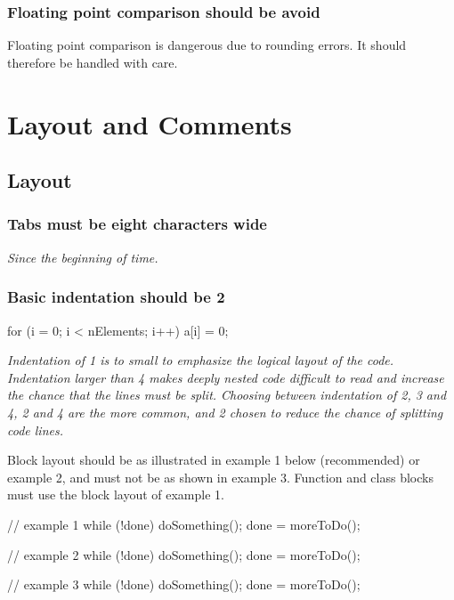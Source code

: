 \documentclass[a4paper,11pt,oneside]{scrbook}
\newcommand{\guideline}[1]{{\subsection{#1}}}
\newcommand{\motivation}[1]{{\normalfont \itshape #1}}
\begin{document}
\guideline{Floating point comparison should be avoid}

Floating point comparison is dangerous due to rounding errors. It should therefore
be handled with care.

\chapter{Layout and Comments}

\section{Layout}

\guideline{Tabs must be eight characters wide}

\motivation{
  Since the beginning of time.
}

\guideline{Basic indentation should be 2}

\begin{code}
  for (i = 0; i < nElements; i++) {
    a[i] = 0; 
  }
\end{code}

\motivation{ 
  Indentation of 1 is to small to emphasize the logical
  layout of the code. Indentation larger than 4 makes deeply nested
  code difficult to read and increase the chance that the lines must
  be split. Choosing between indentation of 2, 3 and 4, 2 and 4 are
  the more common, and 2 chosen to reduce the chance of splitting code
  lines.
}

Block layout should be as illustrated in example 1 below (recommended)
or example 2, and must not be as shown in example 3. Function and
class blocks must use the block layout of example 1.

\begin{code}
  // example 1
  while (!done) {
    doSomething();
    done = moreToDo();
  }

  // example 2
  while (!done)
  {
    doSomething();
    done = moreToDo();
  }

  // example 3
  while (!done)
    {
      doSomething();
      done = moreToDo();
    }
\end{code}
\end{document}
